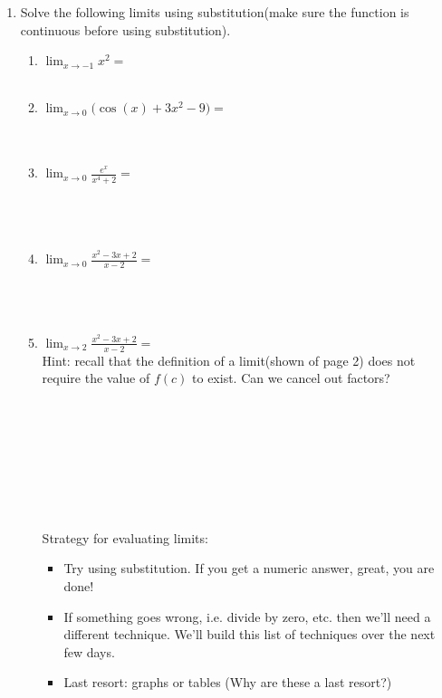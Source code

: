 \documentclass[12pt]{report}
\begin{document}
\begin{enumerate}
\item Solve the following limits using substitution(make sure the function is continuous before using substitution).\\
\begin{enumerate}[label=\alph*.]
    \item $\displaystyle{\lim_{x\to-1} x^2} =$\\\\
    \item $\displaystyle{\lim_{x\to 0} (\cos(x)+3x^2-9}) =$\\\\\\
    \item $\displaystyle{\lim_{x\to 0} \frac{e^x}{x^4+2}} =$\\\\\\\\
    \item $\displaystyle{\lim_{x\to 0} \frac{x^{2}-3x+2}{x-2}}=$\\\\\\\\
    \item $\displaystyle{\lim_{x\to 2} \frac{x^{2}-3x+2}{x-2}}=$\\
    Hint: recall that the definition of a limit(shown of page 2) does not require the value of $f(c)$ to exist. Can we cancel out factors?
    \\\\\\\\\\\\\\\\\\

    Strategy for evaluating limits:
\begin{itemize}
\item Try using substitution. If you get a numeric answer, great, you are done!
\item If something goes wrong, i.e. divide by zero, etc. then we'll need a different technique. We'll build this list of techniques over the next few days.
\item Last resort: graphs or tables (Why are these a last resort?)
\end{itemize} 
    

\end{enumerate}
\end{enumerate}
\end{document}
